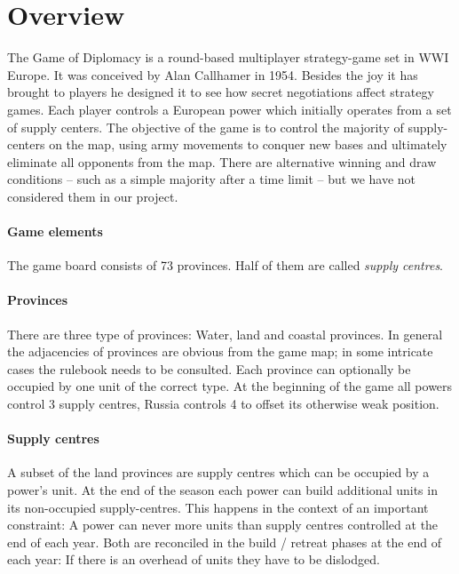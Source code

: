 \documentclass[pdftex,12pt,a4paper]{report}
\begin{document}
\section{Overview}

The Game of Diplomacy is a round-based multiplayer strategy-game set
in WWI Europe. It was conceived by Alan Callhamer in 1954. Besides
the joy it has brought to players he designed it to see how 
secret negotiations affect strategy games. Each player controls a 
European power which initially operates from a set of supply centers.
The objective of the game is to control the majority of supply-centers
on the map, using army movements to conquer new bases and ultimately
eliminate all opponents from the map. There are alternative winning
and draw conditions -- such as a simple majority after a time limit -- 
but we have not considered them in our project.

\paragraph{Game elements}

The game board consists of 73 provinces. Half of them are 
called \textit{supply centres}.

\paragraph{Provinces}

There are three type of provinces: Water, land and coastal 
provinces. In general the adjacencies of provinces are obvious
from the game map; in some intricate cases the rulebook needs to
be consulted. Each province can optionally be occupied by one
unit of the correct type. At the beginning of the game all powers
control 3 supply centres, Russia controls 4 to offset its
otherwise weak position.

\paragraph{Supply centres}

A subset of the land provinces are supply centres which can be 
occupied by a power's unit. At the end of the season each power
can build additional units in its non-occupied supply-centres.
This happens in the context of an important constraint: A power 
can never more units than supply centres controlled at the end
of each year. Both are reconciled in the build / retreat phases
at the end of each year: If there is an overhead of units they
have to be dislodged.
\end{document}
